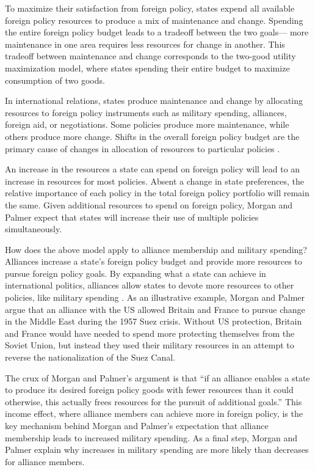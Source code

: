 \documentclass[12pt]{article}
\begin{document}
To maximize their satisfaction from foreign policy, states expend all available foreign policy resources to produce a mix of maintenance and change. 
Spending the entire foreign policy budget leads to a tradeoff between the two goals--- more maintenance in one area requires less resources for change in another. 
This tradeoff between maintenance and change corresponds to the two-good utility maximization model, where states spending their entire budget to maximize consumption of two goods.


In international relations, states produce maintenance and change by allocating resources to foreign policy instruments such as military spending, alliances, foreign aid, or negotiations. 
Some policies produce more maintenance, while others produce more change. 
Shifts in the overall foreign policy budget are the primary cause of changes in allocation of resources to particular policies \citep{MorganPalmer2000}.


An increase in the resources a state can spend on foreign policy will lead to an increase in resources for most policies.
Absent a change in state preferences, the relative importance of each policy in the total foreign policy portfolio will remain the same. 
Given additional resources to spend on foreign policy, Morgan and Palmer expect that states will increase their use of multiple policies simultaneously. 


How does the above model apply to alliance membership and military spending? 
Alliances increase a state's foreign policy budget and provide more resources to pursue foreign policy goals.
By expanding what a state can achieve in international politics, alliances allow states to devote more resources to other policies, like military spending \citep{MorganPalmer2003}. 
As an illustrative example, Morgan and Palmer argue that an alliance with the US allowed Britain and France to pursue change in the Middle East during the 1957 Suez crisis.
Without US protection, Britain and France would have needed to spend more protecting themselves from the Soviet Union, but instead they used their military resources in an attempt to reverse the nationalization of the Suez Canal.


The crux of Morgan and Palmer's argument is that ``if an alliance enables a state to produce its desired foreign policy goods with fewer resources than it could otherwise, this actually frees resources for the pursuit of additional goals.''
This income effect, where alliance members can achieve more in foreign policy, is the key mechanism behind Morgan and Palmer's expectation that alliance membership leads to increased military spending. 
As a final step, Morgan and Palmer explain why increases in military spending are more likely than decreases for alliance members. 
\end{document}
